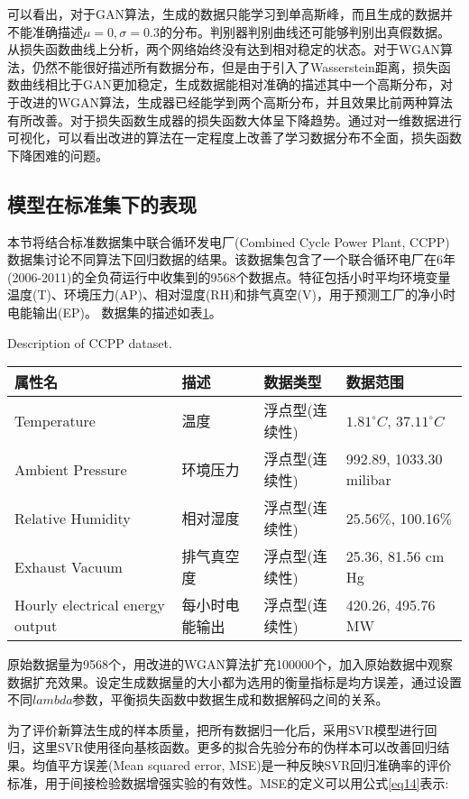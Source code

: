 可以看出，对于GAN算法，生成的数据只能学习到单高斯峰，而且生成的数据并不能准确描述$\mu=0,\sigma=0.3$的分布。判别器判别曲线还可能够判别出真假数据。从损失函数曲线上分析，两个网络始终没有达到相对稳定的状态。对于WGAN算法，仍然不能很好描述所有数据分布，但是由于引入了Wasserstein距离，损失函数曲线相比于GAN更加稳定，生成数据能相对准确的描述其中一个高斯分布，对于改进的WGAN算法，生成器已经能学到两个高斯分布，并且效果比前两种算法有所改善。对于损失函数生成器的损失函数大体呈下降趋势。通过对一维数据进行可视化，可以看出改进的算法在一定程度上改善了学习数据分布不全面，损失函数下降困难的问题。
\subsection{模型在标准集下的表现}
本节将结合标准数据集中联合循环发电厂(Combined Cycle Power Plant, CCPP)数据集讨论不同算法下回归数据的结果。该数据集包含了一个联合循环电厂在6年(2006-2011)的全负荷运行中收集到的9568个数据点。特征包括小时平均环境变量温度(T)、环境压力(AP)、相对湿度(RH)和排气真空(V)，用于预测工厂的净小时电能输出(EP)。
数据集的描述如表\ref{tabccpp}。
\begin{table}[htpb]
	\centering
	{Description of CCPP dataset.}
	\label{tabccpp}
	\begin{tabular}{llll} \toprule
		属性名   & 描述 & 数据类型&数据范围  \\  \midrule
		Temperature&温度&浮点型(连续性)&$1.81^\circ C$, $37.11^\circ C$\\
		Ambient Pressure&环境压力&浮点型(连续性)&992.89, 1033.30 milibar\\
		Relative Humidity&相对湿度&浮点型(连续性)& 25.56$\%$, 100.16$\%$ \\
		Exhaust Vacuum&排气真空度&浮点型(连续性)&25.36, 81.56 cm Hg\\
		Hourly electrical energy output&每小时电能输出&浮点型(连续性)&420.26, 495.76 MW\\ \bottomrule
	\end{tabular}
\end{table}

原始数据量为9568个，用改进的WGAN算法扩充100000个，加入原始数据中观察数据扩充效果。设定生成数据量的大小都为选用的衡量指标是均方误差，通过设置不同$lambda$参数，平衡损失函数中数据生成和数据解码之间的关系。

为了评价新算法生成的样本质量，把所有数据归一化后，采用SVR模型进行回归，这里SVR使用径向基核函数。更多的拟合先验分布的伪样本可以改善回归结果。均值平方误差(Mean squared error, MSE)是一种反映SVR回归准确率的评价标准，用于间接检验数据增强实验的有效性。MSE的定义可以用公式\ref{eq14}表示:

